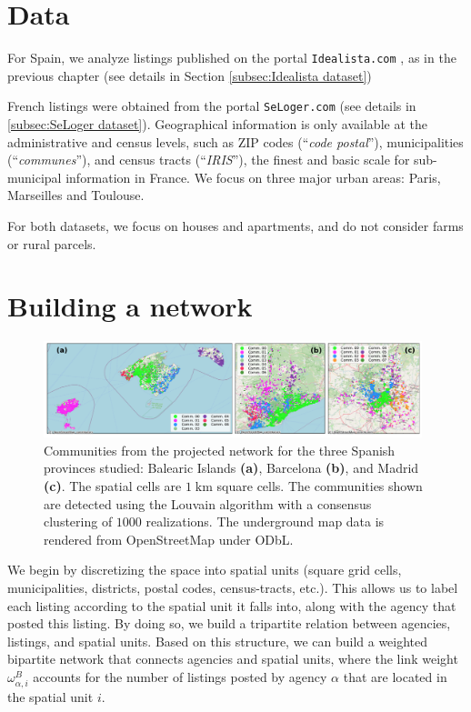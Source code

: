 \section{Data}

For Spain, we analyze listings published on the portal \texttt{Idealista.com} \cite{idealista}, as in the previous chapter (see details in Section \ref{subsec:Idealista dataset})

French listings were obtained from the portal \texttt{SeLoger.com} \cite{SeLoger} (see details in \ref{subsec:SeLoger dataset}). Geographical information is only available at the administrative and census levels, such as ZIP codes (``\textit{code postal}''), municipalities (``\textit{communes}''), and census tracts (``\textit{IRIS}''), the finest and basic scale for sub-municipal information in France. We focus on three major urban areas: Paris, Marseilles and Toulouse. 

For both datasets, we focus on houses and apartments, and do not consider farms or rural parcels.

\section{Building a network \label{sec:materials_and_methods}}

\begin{figure}[t]
    \centering
    \includegraphics[width = 0.98\textwidth]{Figs/Idealista_segmentation/Cell_communities.pdf}
    \caption[Market segmentation for $1 \; \textrm{km}$ square cells.]{ Communities from the projected network for the three Spanish provinces studied: Balearic Islands \textbf{(a)}, Barcelona \textbf{(b)}, and Madrid \textbf{(c)}. The spatial cells are $1 \; \textrm{km}$ square cells. The communities shown are detected using the Louvain algorithm with a consensus clustering of $1000$ realizations. The underground map data is rendered from OpenStreetMap under ODbL.\label{fig:cell_1000}}
\end{figure}

We begin by discretizing the space into spatial units (square grid cells, municipalities, districts, postal codes, census-tracts, etc.).
This allows us to label each listing according to the spatial unit it falls into, along with the agency that posted this listing. By doing so, we build a tripartite relation between agencies, listings, and spatial units. Based on this structure, we can build a weighted bipartite network that connects agencies and spatial units, where the link weight $\omega^{B}_{\alpha,i}$ accounts for the number of listings posted by agency $\alpha$ that are located in the spatial unit $i$.


